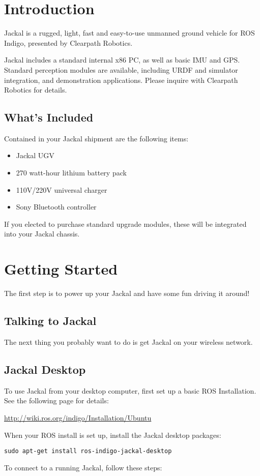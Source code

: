 \documentclass[]{clearpath-manual}
\begin{document}
\tableofcontents

\section{Introduction}

Jackal is a rugged, light, fast and easy-to-use unmanned ground vehicle for ROS Indigo, presented
by Clearpath Robotics.

Jackal includes a standard internal x86 PC, as well as basic IMU and GPS. Standard perception
modules are available, including URDF and simulator integration, and demonstration applications.
Please inquire with Clearpath Robotics for details.

\subsection{What's Included}

Contained in your Jackal shipment are the following items:

\begin{itemize}
  \item Jackal UGV
  \item 270 watt-hour lithium battery pack
  \item 110V/220V universal charger
  \item Sony Bluetooth controller
\end{itemize}

If you elected to purchase standard upgrade modules, these will be integrated into your Jackal chassis.

\section{Getting Started}

The first step is to power up your Jackal and have some fun driving it around!

\subsection{Talking to Jackal}

The next thing you probably want to do is get Jackal on your wireless network.

\subsection{Jackal Desktop}

To use Jackal from your desktop computer, first set up a basic ROS Installation. See the following
page for details:

\url{http://wiki.ros.org/indigo/Installation/Ubuntu}

When your ROS install is set up, install the Jackal desktop packages:

\begin{lstlisting}
sudo apt-get install ros-indigo-jackal-desktop
\end{lstlisting}

To connect to a running Jackal, follow these steps:
\end{document}
